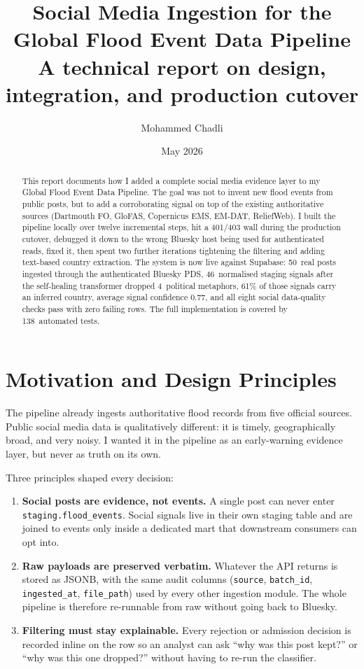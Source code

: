 \documentclass[11pt]{article}
\title{Social Media Ingestion for the Global Flood Event Data Pipeline\\
       \large A technical report on design, integration, and production cutover}
\author{Mohammed Chadli}
\date{May 2026}
\begin{document}
\maketitle

\begin{abstract}
This report documents how I added a complete social media evidence layer to
my Global Flood Event Data Pipeline. The goal was not to invent new flood
events from public posts, but to add a corroborating signal on top of the
existing authoritative sources (Dartmouth FO, GloFAS, Copernicus EMS,
EM-DAT, ReliefWeb). I built the pipeline locally over twelve incremental
steps, hit a 401/403 wall during the production cutover, debugged it down
to the wrong Bluesky host being used for authenticated reads, fixed it,
then spent two further iterations tightening the filtering and adding
text-based country extraction. The system is now live against Supabase:
50~real posts ingested through the authenticated Bluesky PDS,
46~normalised staging signals after the self-healing transformer dropped
4~political metaphors, 61\% of those signals carry an inferred country,
average signal confidence 0.77, and all eight social data-quality checks
pass with zero failing rows. The full implementation is covered by
138~automated tests.
\end{abstract}

\tableofcontents

\section{Motivation and Design Principles}

The pipeline already ingests authoritative flood records from five
official sources. Public social media data is qualitatively different: it
is timely, geographically broad, and very noisy. I wanted it in the
pipeline as an early-warning evidence layer, but never as truth on its
own.

Three principles shaped every decision:

\begin{enumerate}[leftmargin=*]
  \item \textbf{Social posts are evidence, not events.} A single post can
        never enter \texttt{staging.flood\_events}. Social signals live in
        their own staging table and are joined to events only inside a
        dedicated mart that downstream consumers can opt into.
  \item \textbf{Raw payloads are preserved verbatim.} Whatever the API
        returns is stored as JSONB, with the same audit columns
        (\texttt{source}, \texttt{batch\_id}, \texttt{ingested\_at},
        \texttt{file\_path}) used by every other ingestion module. The
        whole pipeline is therefore re-runnable from raw without going
        back to Bluesky.
  \item \textbf{Filtering must stay explainable.} Every rejection or
        admission decision is recorded inline on the row so an analyst can
        ask ``why was this post kept?'' or ``why was this one dropped?''
        without having to re-run the classifier.
\end{enumerate}
\end{document}
